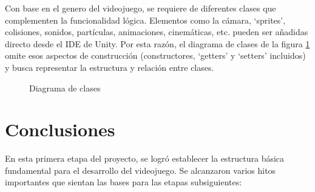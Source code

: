 \documentclass[12pt,twoside]{article}
\begin{document}
	Con base en el genero del videojuego, se requiere de diferentes clases que complementen la funcionalidad lógica. Elementos como la cámara, `sprites', colisiones, sonidos, partículas, animaciones, cinemáticas, etc. pueden ser añadidas directo desde el IDE de Unity. Por esta razón, el diagrama de clases de la figura \ref{diagrama: clases} omite esos aspectos de construcción (constructores, `getters' y `setters' incluidos) y busca representar la estructura y relación entre clases.

	\begin{figure}[H]
		\centering
		\caption{Diagrama de clases}
		\label{diagrama: clases}
	\end{figure}
	
	\clearpage
	
	\section{Conclusiones}
	
	En esta primera etapa del proyecto, se logró establecer la estructura básica fundamental para el desarrollo del videojuego. Se alcanzaron varios hitos importantes que sientan las bases para las etapas subsiguientes:
	
\end{document}
